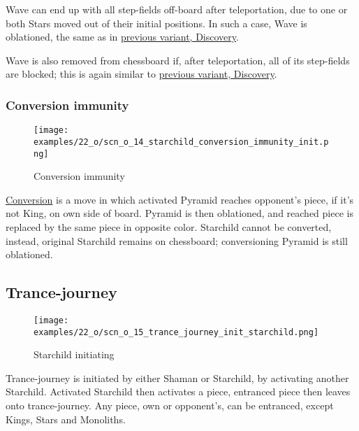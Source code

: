 Wave can end up with all step-fields off-board after teleportation, due to one or both Stars
moved out of their initial positions. In such a case, Wave is oblationed, the same as in
\hyperref[fig:scn_d_11_wave_teleported_off_board]{previous variant, Discovery}.

Wave is also removed from chessboard if, after teleportation, all of its step-fields are
blocked; this is again similar to
\hyperref[fig:scn_d_10_teleported_wave_blocked]{previous variant, Discovery}.

\clearpage %

\subsubsection*{Conversion immunity}

\vspace*{-0.9\baselineskip}
\noindent
\begin{figure}[!h]
\texttt{[image: examples/22\_o/scn\_o\_14\_starchild\_conversion\_immunity\_init.png]}
\caption{Conversion immunity}
\label{fig:scn_o_14_starchild_conversion_immunity_init}
\end{figure}

\hyperref[sec:Mayan Ascendancy/Pyramid/Conversion]{Conversion} is a move in which activated
Pyramid reaches opponent's piece, if it's not King, on own side of board. Pyramid is then
oblationed, and reached piece is replaced by the same piece in opposite color.
Starchild cannot be converted, instead, original Starchild remains on chessboard;
conversioning Pyramid is still oblationed.

\clearpage %

\subsection*{Trance-journey}

\vspace*{-0.9\baselineskip}
\noindent
\begin{wrapfigure}[11]{l}{0.4\textwidth}
\centering
\texttt{[image: examples/22\_o/scn\_o\_15\_trance\_journey\_init\_starchild.png]}
\caption{Starchild initiating}
\label{fig:scn_o_15_trance_journey_init_starchild}
\end{wrapfigure}
Trance-journey is initiated by either Shaman or Starchild, by activating another Starchild.
Activated Starchild then activates a piece, entranced piece then leaves onto trance-journey.
Any piece, own or opponent's, can be entranced, except Kings, Stars and Monoliths.

